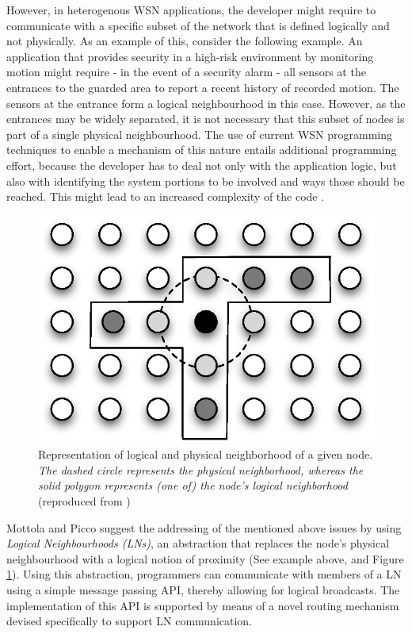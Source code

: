 However, in heterogenous WSN applications, the developer might require to
communicate with a specific subset of the network that is defined logically and
not physically. As an example of this, consider the following example. An
application that provides security in a high-risk environment by monitoring 
motion might require - in the event of a security alarm - all sensors at the
entrances to the guarded area to report a recent history of recorded motion.
The sensors at the entrance form a logical neighbourhood in this case. However,
as the entrances may be widely separated, it is not necessary that this subset
of nodes is part of a single physical neighbourhood. The use of current WSN
programming techniques to enable a mechanism of this nature entails additional
programming effort, because the developer has to deal not only with
the application logic, but also with identifying the system portions to be
involved and ways those should be reached. This might lead to an increased
complexity of the code \cite{mottola_LN:2006}.  

\begin{figure} 
\centering
\includegraphics[scale=0.71]{img/LN_physical_vs_logical.eps} 
\caption[Difference between physical and logical neighborhoods]{Representation 
of logical and physical neighborhood of a given node. \emph{The dashed circle 
represents the physical neighborhood, whereas the solid polygon represents (one 
of) the node's logical neighborhood} (reproduced from
\cite{mottola_LN:2006})}
\label{Fig:LN_physical_vs_logical}
\end{figure} 

Mottola and Picco \cite{mottola_LN:2006} suggest the addressing of the
mentioned above issues by using \emph{Logical Neighbourhoods (LNs)}, an
abstraction that replaces the node's physical neighbourhood with a logical notion of
proximity (See example above, and Figure \ref{Fig:LN_physical_vs_logical}). Using this abstraction, programmers
can communicate
with members of a LN using a simple message passing API,
thereby allowing for logical broadcasts. The implementation of this API is
supported by means of a novel routing mechanism devised specifically to support
LN communication.


